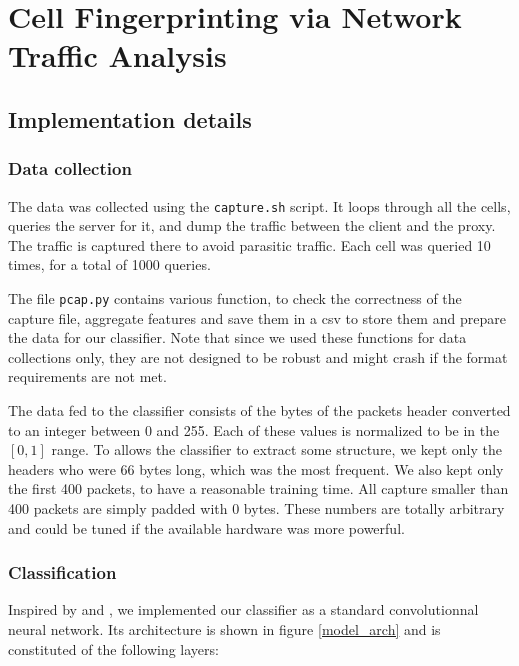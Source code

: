 \documentclass[10pt,conference,compsocconf]{IEEEtran}
\begin{document}
\section{Cell Fingerprinting via Network Traffic Analysis}

\subsection{Implementation details}
\subsubsection{Data collection}
The data was collected using the \verb|capture.sh| script. It loops through all the cells, queries the server for it, and dump the traffic between the client and the proxy. The traffic is captured there to avoid parasitic traffic. Each cell was queried 10 times, for a total of 1000 queries.

The file \verb|pcap.py| contains various function, to check the correctness of the capture file, aggregate features and save them in a csv to store them and prepare the data for our classifier. Note that since we used these functions for data collections only, they are not designed to be robust and might crash if the format requirements are not met. 

The data fed to the classifier consists of the bytes of the packets header converted to an integer between 0 and 255. Each of these values is normalized to be in the $[0,1]$ range. To allows the classifier to extract some structure, we kept only the headers who were 66 bytes long, which was the most frequent. We also kept only the first 400 packets, to have a reasonable training time. All capture smaller than 400 packets are simply padded with 0 bytes. These numbers are totally arbitrary and could be tuned if the available hardware was more powerful.

\subsubsection{Classification}
Inspired by \cite{tor_classification} and \cite{dl_encrypted}, we implemented our classifier as a standard convolutionnal neural network. Its architecture is shown in figure \ref{model_arch} and is constituted of the following layers:
\end{document}
